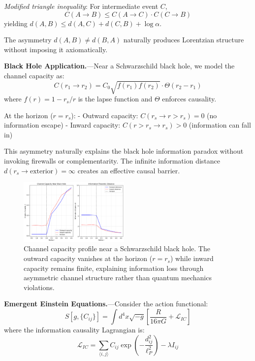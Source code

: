 \documentclass[aps,prl,twocolumn,showpacs,superscriptaddress,groupedaddress]{revtex4-2}
\begin{document}
\textit{Modified triangle inequality}: For intermediate event $C$,
\begin{equation}
C(A \to B) \leq C(A \to C) \cdot C(C \to B)
\end{equation}
yielding $d(A,B) \leq d(A,C) + d(C,B) + \log\alpha$.

The asymmetry $d(A,B) \neq d(B,A)$ naturally produces Lorentzian structure without imposing it axiomatically.

\textbf{Black Hole Application.}---Near a Schwarzschild black hole, we model the channel capacity as:
\begin{equation}
C(r_1 \to r_2) = C_0 \sqrt{f(r_1)f(r_2)} \cdot \Theta(r_2 - r_1)
\end{equation}
where $f(r) = 1 - r_s/r$ is the lapse function and $\Theta$ enforces causality.

At the horizon ($r = r_s$):
- Outward capacity: $C(r_s \to r > r_s) = 0$ (no information escape)
- Inward capacity: $C(r > r_s \to r_s) > 0$ (information can fall in)

This asymmetry naturally explains the black hole information paradox without invoking firewalls or complementarity. The infinite information distance $d(r_s \to \text{exterior}) = \infty$ creates an effective causal barrier.

\begin{figure}[htbp]
\centering
\includegraphics[width=0.48\textwidth]{black_hole_capacity.png}
\caption{Channel capacity profile near a Schwarzschild black hole. The outward capacity vanishes at the horizon ($r = r_s$) while inward capacity remains finite, explaining information loss through asymmetric channel structure rather than quantum mechanics violations.}
\label{fig:bh_capacity}
\end{figure}

\textbf{Emergent Einstein Equations.}---Consider the action functional:
\begin{equation}
S[g, \{C_{ij}\}] = \int d^4x \sqrt{-g} \left[\frac{R}{16\pi G} + \mathcal{L}_{IC}\right]
\label{eq:action}
\end{equation}
where the information causality Lagrangian is:
\begin{equation}
\mathcal{L}_{IC} = \sum_{\langle i,j \rangle} C_{ij} \exp\left(-\frac{d_{ij}^2}{\ell_P^2}\right) - \lambda I_{ij}
\end{equation}
\end{document}
